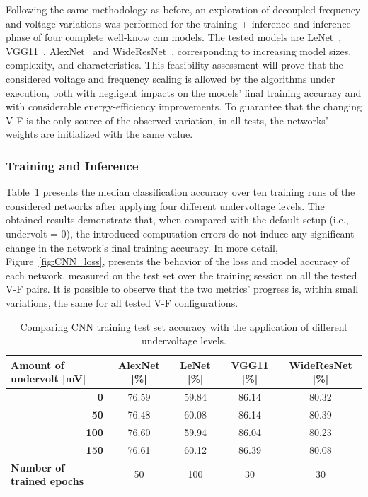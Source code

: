Following the same methodology as before, an exploration of decoupled frequency and voltage variations was performed for the training + inference and inference phase of four complete well-know \acrshort{cnn} models. The tested models are LeNet~\cite{lecun_gradient-based_1998}, VGG11~\cite{simonyan_very_2015}, AlexNet~\cite{krizhevsky_imagenet_2012} and WideResNet~\cite{zagoruyko_wide_2017}, corresponding to increasing model sizes, complexity, and characteristics. This feasibility assessment will prove that the considered voltage and frequency scaling is allowed by the algorithms under execution, both with negligent impacts on the models' final training accuracy and with considerable energy-efficiency improvements. To guarantee that the changing V-F is the only source of the observed variation, in all tests, the networks' weights are initialized with the same value.


\subsubsection{Training and Inference}

Table~\ref{tab:trainingAcc} presents the median classification accuracy over ten training runs of the considered networks after applying four different undervoltage levels. The obtained results demonstrate that, when compared with the default setup (i.e., undervolt = 0), the introduced computation errors do not induce any significant change in the network's final training accuracy. 
In more detail, Figure~\ref{fig:CNN_loss}, presents the behavior of the loss and model accuracy of each network, measured on the test set over the training session on all the tested V-F pairs. It is possible to observe that the two metrics' progress is, within small variations, the same for all tested V-F configurations.

\begin{table}[htb]
    \centering
   
    \label{tab:trainingAcc}
    \begin{tabular}{rcccc}
        \multicolumn{1}{l}{{\textbf{Amount of undervolt {[}mV{]}}}} &
          \textbf{AlexNet {[}\%{]}} &
          \textbf{LeNet {[}\%{]}} &
          \textbf{VGG11 {[}\%{]}} &
          \textbf{WideResNet {[}\%{]}} \\ \hline
        \textbf{0}   & 76.59 & 59.84 & 86.14 & 80.32 \\
        \textbf{50}  & 76.48 & 60.08 & 86.14 & 80.39 \\
        \textbf{100} & 76.60 & 59.94 & 86.04 & 80.23 \\
        \textbf{150} & 76.61 & 60.12 & 86.39 & 80.08 \\ \hline
        \multicolumn{1}{l}{{\textbf{Number of trained epochs}}} &
          50 &
          100 &
          30 &
          30
    \end{tabular}%
     \caption{Comparing CNN training test set accuracy with the application of different undervoltage levels.}
\end{table}

